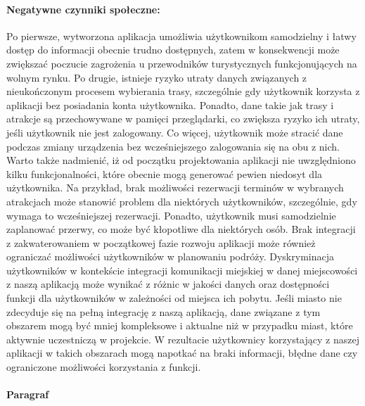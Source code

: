 \paragraph*{Negatywne czynniki społeczne:}
\newline \indent Po pierwsze, wytworzona aplikacja umożliwia użytkownikom samodzielny i łatwy dostęp do informacji obecnie trudno dostępnych, zatem w konsekwencji może zwiększać poczucie zagrożenia u przewodników turystycznych funkcjonujących na wolnym rynku. 
\newline \indent Po drugie, istnieje ryzyko utraty danych związanych z nieukończonym procesem wybierania trasy, szczególnie gdy użytkownik korzysta z aplikacji bez posiadania konta użytkownika. Ponadto, dane takie jak trasy i atrakcje są przechowywane w pamięci przeglądarki, co zwiększa ryzyko ich utraty, jeśli użytkownik nie jest zalogowany. Co więcej, użytkownik może stracić dane podczas zmiany urządzenia bez wcześniejszego zalogowania się na obu z nich.
\newline \indent Warto także nadmienić, iż od początku projektowania aplikacji nie uwzględniono kilku funkcjonalności, które obecnie mogą generować pewien niedosyt dla użytkownika. Na przykład, brak możliwości rezerwacji terminów w wybranych atrakcjach może stanowić problem dla niektórych użytkowników, szczególnie, gdy wymaga to wcześniejszej rezerwacji. Ponadto, użytkownik musi samodzielnie zaplanować przerwy, co może być kłopotliwe dla niektórych osób. Brak integracji z zakwaterowaniem w początkowej fazie rozwoju aplikacji może również ograniczać możliwości użytkowników w planowaniu podróży.
\newline\indent Dyskryminacja użytkowników w kontekście integracji komunikacji miejskiej w danej miejscowości z naszą aplikacją może wynikać z różnic w jakości danych oraz dostępności funkcji dla użytkowników w zależności od miejsca ich pobytu.
Jeśli miasto nie zdecyduje się na pełną integrację z naszą aplikacją, dane związane z tym obszarem mogą być mniej kompleksowe i aktualne niż w przypadku miast, które aktywnie uczestniczą w projekcie. W rezultacie użytkownicy korzystający z naszej aplikacji w takich obszarach mogą napotkać na braki informacji, błędne dane czy ograniczone możliwości korzystania z funkcji.

\paragraph{Paragraf}


